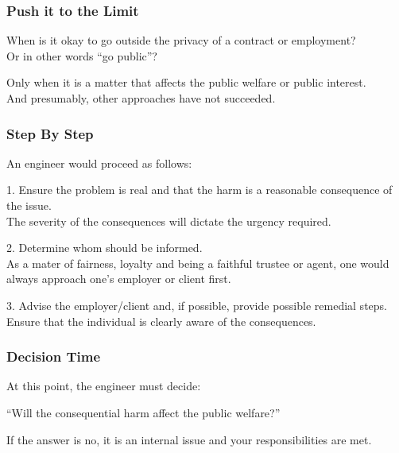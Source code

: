 \begin{frame}
\frametitle{Push it to the Limit}

When is it okay to go outside the privacy of a contract or employment?\\
\quad Or in other words ``go public''?

Only when it is a matter that affects the public welfare or public interest.\\
\quad And presumably, other approaches have not succeeded.

\end{frame}



\begin{frame}
\frametitle{Step By Step}

An engineer would proceed as follows:
 
1. Ensure the problem is real and that the harm is a reasonable consequence of the issue.\\ \quad The severity of the consequences will dictate the urgency required.

2. Determine whom should be informed.\\
\quad As a mater of fairness, loyalty and being a faithful trustee or agent, one would always approach one's employer or client first.

3. Advise the employer/client and, if possible, provide possible remedial steps.\\
\quad Ensure that the individual is clearly aware of the consequences.

\end{frame}



\begin{frame}
\frametitle{Decision Time}

At this point, the engineer must decide:

``Will the consequential harm affect the public welfare?''

If the answer is no, it is an internal issue and your responsibilities are met.

\end{frame}



